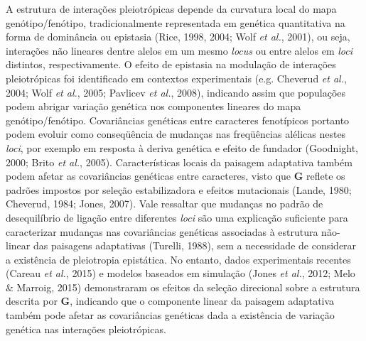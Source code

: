 \documentclass[12pt,twoside]{report}
\begin{document}
A estrutura de interações pleiotrópicas depende da curvatura local do
mapa genótipo/fenótipo, tradicionalmente representada em genética
quantitativa na forma de dominância ou epistasia (Rice, 1998, 2004; Wolf
\emph{et al.}, 2001), ou seja, interações não lineares dentre alelos em
um mesmo \emph{locus} ou entre alelos em \emph{loci} distintos,
respectivamente. O efeito de epistasia na modulação de interações
pleiotrópicas foi identificado em contextos experimentais (e.g. Cheverud
\emph{et al.}, 2004; Wolf \emph{et al.}, 2005; Pavlicev \emph{et al.},
2008), indicando assim que populações podem abrigar variação genética
nos componentes lineares do mapa genótipo/fenótipo. Covariâncias
genéticas entre caracteres fenotípicos portanto podem evoluir como
conseqüência de mudanças nas freqüências alélicas nestes \emph{loci},
por exemplo em resposta à deriva genética e efeito de fundador
(Goodnight, 2000; Brito \emph{et al.}, 2005). Características locais da
paisagem adaptativa também podem afetar as covariâncias genéticas entre
caracteres, visto que $\mathbf{G}$ reflete os padrões impostos por
seleção estabilizadora e efeitos mutacionais (Lande, 1980; Cheverud,
1984; Jones, 2007). Vale ressaltar que mudanças no padrão de
desequilíbrio de ligação entre diferentes \emph{loci} são uma explicação
suficiente para caracterizar mudanças nas covariâncias genéticas
associadas à estrutura não-linear das paisagens adaptativas (Turelli,
1988), sem a necessidade de considerar a existência de pleiotropia
epistática. No entanto, dados experimentais recentes (Careau \emph{et
al.}, 2015) e modelos baseados em simulação (Jones \emph{et al.}, 2012;
Melo \& Marroig, 2015) demonstraram os efeitos da seleção direcional
sobre a estrutura descrita por $\mathbf{G}$, indicando que o componente
linear da paisagem adaptativa também pode afetar as covariâncias
genéticas dada a existência de variação genética nas interações
pleiotrópicas.
\end{document}
